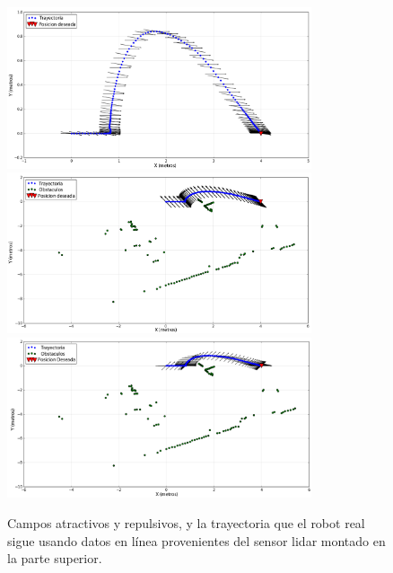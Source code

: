 \begin{figure}%
  \centering \footnotesize
  \includegraphics[width=0.80\textwidth]{images/fattr_lidar_s.png}
  \includegraphics[width=0.80\textwidth]{images/frep_lidar_s.png}
  \includegraphics[width=0.80\textwidth]{images/fnav_lidar_s.png}
  \captionsetup{font=footnotesize}
  \caption{Campos atractivos y repulsivos, y la trayectoria que el robot real sigue 
  usando datos en línea provenientes del sensor lidar montado en la parte superior.}
  \label{f:kbki_autonomo}
\end{figure}

